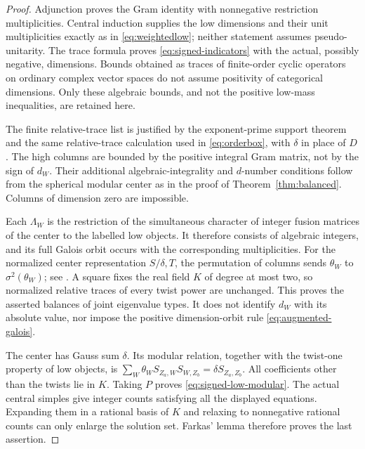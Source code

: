 \begin{proof}
Adjunction proves the Gram identity with nonnegative restriction
multiplicities. Central induction supplies the low dimensions and their
unit multiplicities exactly as in \eqref{eq:weightedlow}; neither
statement assumes pseudo-unitarity. The trace formula
\cite{NS} proves \eqref{eq:signed-indicators} with the actual, possibly
negative, dimensions. Bounds obtained as traces of finite-order cyclic
operators on ordinary complex vector spaces do not assume positivity
of categorical dimensions. Only these algebraic bounds, and not the
positive low-mass inequalities, are retained here.

The finite relative-trace list is justified by the exponent-prime
support theorem \cite{BNRW} and the same relative-trace calculation
used in \eqref{eq:orderbox}, with $\delta$ in place of $D$. The high
columns are bounded by the positive integral Gram matrix, not by the
sign of $d_W$. Their additional algebraic-integrality and $d$-number
conditions follow from the spherical modular center as in the proof of
Theorem~\ref{thm:balanced}. Columns of dimension zero are impossible.

Each $\Lambda_W$ is the restriction of the simultaneous character of
integer fusion matrices of the center to the labelled low objects.
It therefore consists of algebraic integers, and its full Galois orbit
occurs with the corresponding multiplicities. For the normalized
center representation $S/\delta,T$, the permutation of columns sends
$\theta_W$ to $\sigma^2(\theta_W)$; see
\cite[Theorem~2.9]{BNRW}. A square fixes the real field $K$ of degree
at most two, so normalized relative traces of every twist power are
unchanged. This proves the asserted balances of joint eigenvalue types.
It does not identify $d_W$ with its absolute value, nor impose the
positive dimension-orbit rule \eqref{eq:augmented-galois}.

The center has Gauss sum $\delta$. Its modular relation, together with
the twist-one property of low objects, is
$\sum_W\theta_W S_{Z_a,W}S_{W,Z_b}=\delta S_{Z_a,Z_b}$.
All coefficients other than the twists lie in $K$. Taking $P$ proves
\eqref{eq:signed-low-modular}. The actual central simples give integer
counts satisfying all the displayed equations. Expanding them in a
rational basis of $K$ and relaxing to nonnegative rational counts can
only enlarge the solution set. Farkas' lemma therefore proves the
last assertion.
\end{proof}

